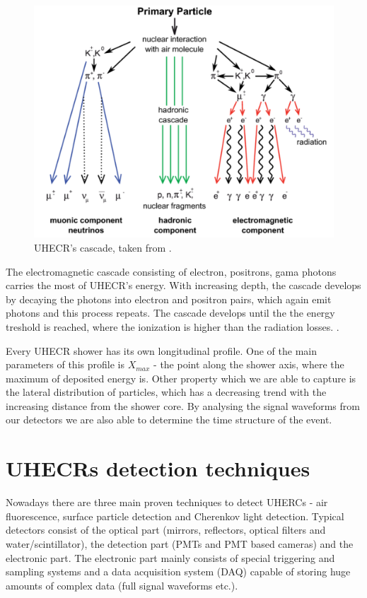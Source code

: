 \begin{figure}[H]
 \centering
 \includegraphics[scale = 0.3]{./pictures/cascade}
 \caption{UHECR's cascade, taken from \cite{Cascades}.}
 \label{cascade}
 
\end{figure}

\par

The electromagnetic cascade consisting of electron, positrons, gama photons carries the most of UHECR's energy. With increasing depth, the cascade develops by decaying the photons into electron and positron pairs, which again emit photons and this process repeats. The cascade develops until the the energy treshold is reached, where the ionization is higher than the radiation losses. \cite{Tomankova2016_1000061954}.


\par
Every UHECR shower has its own longitudinal profile. One of the main parameters of this profile is $X_{max}$ - the point along the shower axis, where the maximum of deposited energy is. Other property which we are able to capture is the lateral distribution of particles, which has a decreasing trend with the increasing distance from the shower core. By analysing the signal waveforms from our detectors we are also able to determine the time structure of the event.

\section{UHECRs detection techniques}
Nowadays there are three main proven techniques to detect UHERCs - 
air fluorescence, surface particle detection and Cherenkov light detection. Typical detectors consist of the optical part (mirrors, reflectors, optical filters and water/scintillator), the detection part (PMTs and PMT based cameras) and the electronic part. The electronic part mainly consists of special triggering and sampling systems and a data acquisition system (DAQ) capable of storing huge amounts of complex data (full signal waveforms etc.).

